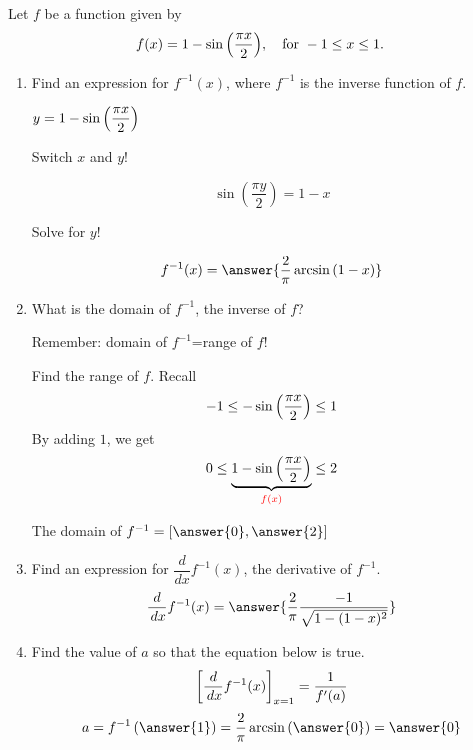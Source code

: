 \documentclass{ximera}
\author{Nela Lakos}
\begin{document}
\begin{exercise}

 Let $f$ be a function given by
 \[
 f(x)=1-\sin{\Bigl(\dfrac{\pi x}{2}\Bigr)}, \quad\text{for }-1\le x \le1.
 \]
 
\begin{enumerate}

\item Find an expression for $f^{-1}(x)$, where $f^{-1}$ is the inverse function of $f$.

\begin{hint}
\(y=1-\sin{\Bigl(\dfrac{\pi x}{2}\Bigr)}\)


Switch $x$ and $y$!
\end{hint}
\begin{hint}
\[
 \sin{\left(\dfrac{\pi y}{2}\right)}=1-x
 \]

Solve for $y$!

\end{hint}


\[
f^{-1}(x)=\answer{\frac{2}{\pi} \arcsin{(1-x)}}
\]


\item What is the domain of $f^{-1}$, the inverse of $f$?

\begin{hint}
Remember: domain of $f^{-1}$=range of $f$!
\end{hint} 
 \begin{hint}
 Find the range of $f$. Recall
 \[
 -1\le -\sin{\Bigl(\dfrac{\pi x}{2}\Bigr)}\le1
 \]
 By adding $1$, we get 
\[
0\le\underbrace{1-\sin{\Bigl(\dfrac{\pi x}{2}\Bigr)}}_{\color{red}{f(x)}}\le2
\]

\end{hint}
The domain of $f^{-1}=\left[\answer{0},\answer{2}\right]$

 
\item  Find an expression for $\dfrac{d}{dx}f^{-1}(x)$, the derivative of $f^{-1}$.
	   \[
	   \ddx f^{-1}(x)=\answer{\frac{2}{\pi }\frac{-1}{\sqrt{1-(1-x)^2}}}
	   \]
	 \item   Find the value of $a$ so that the equation below is true.
	   \[
           \bigg[ \frac{d}{\,d x} f^{-1}(x) \bigg]_{x=1}=\frac{1}{f'(a)}
           \]
	   \[
	   a=f^{-1}\left(\answer{1}\right)=\frac{2}{\pi }\arcsin\left(\answer{0}\right)=\answer{0}
	   \]
\end{enumerate}
\end{exercise}
\end{document}
